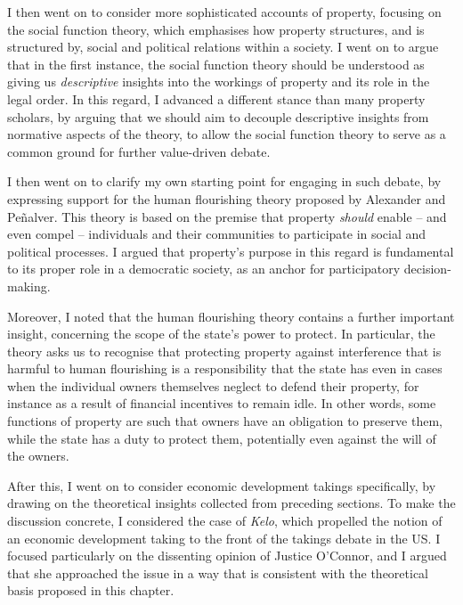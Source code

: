 I then went on to consider more sophisticated accounts of property, focusing on the social function theory, which emphasises how property structures, and is structured by, social and political relations within a society. I went on to argue that in the first instance, the social function theory should be understood as giving us {\it descriptive} insights into the workings of property and its role in the legal order. In this regard, I advanced a different stance than many property scholars, by arguing that we should aim to decouple descriptive insights from normative aspects of the theory, to allow the social function theory to serve as a common ground for further value-driven debate.

I then went on to clarify my own starting point for engaging in such debate, by expressing support for the human flourishing theory proposed by Alexander and Pe\~{n}alver. This theory is based on the premise that property {\it should} enable -- and even compel -- individuals and their communities to  participate in social and political processes. I argued that property's purpose in this regard is  fundamental to its proper role in a democratic society, as an anchor for participatory decision-making.  

Moreover, I noted that the human flourishing theory contains a further important insight, concerning the scope of the state's power to protect. In particular, the theory asks us to recognise that protecting property against interference that is harmful to human flourishing is a responsibility that the state has even in cases when the individual owners themselves neglect to defend their property, for instance as a result of financial incentives to remain idle. In other words, some functions of property are such that owners have an obligation to preserve them, while the state has a duty to protect them, potentially even against the will of the owners.

After this, I went on to consider economic development takings specifically, by drawing on the theoretical insights collected from preceding sections. To make the discussion concrete, I considered the case of {\it Kelo}, which propelled the notion of an economic development taking to the front of the takings debate in the US. I focused particularly on the dissenting opinion of Justice O'Connor, and I argued that she approached the issue in a way that is consistent with the theoretical basis proposed in this chapter.

